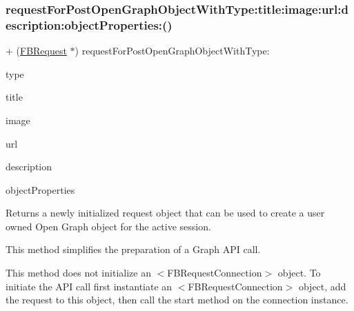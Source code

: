 \subsubsection{\texorpdfstring{request\+For\+Post\+Open\+Graph\+Object\+With\+Type\+:title\+:image\+:url\+:description\+:object\+Properties\+:()}{requestForPostOpenGraphObjectWithType:title:image:url:description:objectProperties:()}\hspace{0.1cm}{\footnotesize\ttfamily [3/5]}}
{\footnotesize\ttfamily + (\hyperlink{interfaceFBRequest}{F\+B\+Request} $\ast$) request\+For\+Post\+Open\+Graph\+Object\+With\+Type\+: \begin{DoxyParamCaption}\item[{(N\+S\+String $\ast$)}]{type }\item[{title:(N\+S\+String $\ast$)}]{title }\item[{image:(id)}]{image }\item[{url:(id)}]{url }\item[{description:(N\+S\+String $\ast$)}]{description }\item[{objectProperties:(N\+S\+Dictionary $\ast$)}]{object\+Properties }\end{DoxyParamCaption}}

Returns a newly initialized request object that can be used to create a user owned Open Graph object for the active session.

This method simplifies the preparation of a Graph A\+PI call.

This method does not initialize an $<$\+F\+B\+Request\+Connection$>$ object. To initiate the A\+PI call first instantiate an $<$\+F\+B\+Request\+Connection$>$ object, add the request to this object, then call the {\ttfamily start} method on the connection instance.


